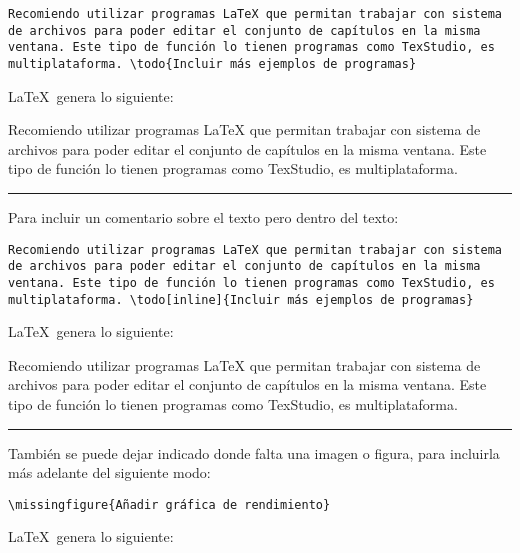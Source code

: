 \begin{lstlisting}[style=Latex-color]
	Recomiendo utilizar programas LaTeX que permitan trabajar con sistema de archivos para poder editar el conjunto de capítulos en la misma ventana. Este tipo de función lo tienen programas como TexStudio, es multiplataforma. \todo{Incluir más ejemplos de programas}
\end{lstlisting}

\LaTeX~genera lo siguiente:
\\
\par Recomiendo utilizar programas LaTeX que permitan trabajar con sistema de archivos para poder editar el conjunto de capítulos en la misma ventana. Este tipo de función lo tienen programas como TexStudio, es multiplataforma. 
\vspace{1em}
\noindent\hrule
\vspace{1em}
\par Para incluir un comentario sobre el texto pero dentro del texto:

\begin{lstlisting}[style=Latex-color]
	Recomiendo utilizar programas LaTeX que permitan trabajar con sistema de archivos para poder editar el conjunto de capítulos en la misma ventana. Este tipo de función lo tienen programas como TexStudio, es multiplataforma. \todo[inline]{Incluir más ejemplos de programas}
\end{lstlisting}

\LaTeX~genera lo siguiente:
\\
\par Recomiendo utilizar programas LaTeX que permitan trabajar con sistema de archivos para poder editar el conjunto de capítulos en la misma ventana. Este tipo de función lo tienen programas como TexStudio, es multiplataforma. 
\vspace{1em}
\noindent\hrule
\vspace{1em}
\par También se puede dejar indicado donde falta una imagen o figura, para incluirla más adelante del siguiente modo:

\begin{lstlisting}[style=Latex-color]
\missingfigure{Añadir gráfica de rendimiento}	
\end{lstlisting}

\LaTeX~genera lo siguiente:
\\



